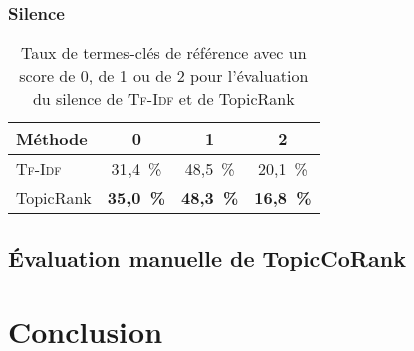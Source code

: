       \subsubsection{Silence}
      \label{subsubsec:main-automatic_evaluation_of_keyphrase_annotation-results-topicrank-silence}
        \begin{table}[h!]
          \centering
          \begin{tabular}{l|c|c|c}
            \toprule
            \textbf{Méthode} & \textbf{0} & \textbf{1} & \textbf{2}\\
            \hline
            \textsc{Tf-Idf} & 31,4~\% & 48,5~\% & 20,1~\%\\
            TopicRank & \textbf{35,0~\%} & \textbf{48,3~\%} & \textbf{16,8~\%}\\
            \bottomrule
          \end{tabular}
          \caption{Taux de termes-clés de référence avec un score de 0, de 1 ou
                   de 2 pour l'évaluation du silence de \textsc{Tf-Idf} et de
                   TopicRank
                   \label{tab:main-automatic_evaluation_of_keyphrase_annotation-results-topicrank-silence_score_ratio}}
        \end{table}

    \subsection{Évaluation manuelle de TopicCoRank}
    \label{subsec:main-automatic_evaluation_of_keyphrase_annotation-results-topiccorank}

    \TODO{\dots}


  \section{Conclusion}
  \label{sec:main-automatic_evaluation_of_keyphrase_annotation-Conclusion}

